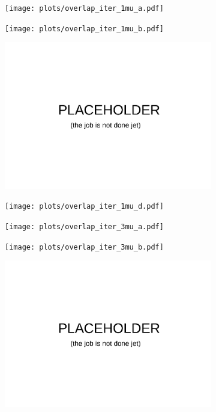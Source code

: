 \begin{figure}
    \centering
    \begin{subfigure}{0.5\textwidth}
    \texttt{[image: plots/overlap\_iter\_1mu\_a.pdf]}
    \end{subfigure}%
    \begin{subfigure}{0.5\textwidth}
    \texttt{[image: plots/overlap\_iter\_1mu\_b.pdf]}
    \end{subfigure}
    \begin{subfigure}{0.5\textwidth}
    \includegraphics[width=\linewidth]{plots/placeholder.pdf}
    \end{subfigure}%
    \begin{subfigure}{0.5\textwidth}
    \texttt{[image: plots/overlap\_iter\_1mu\_d.pdf]}
    \end{subfigure}
    \begin{subfigure}{0.5\textwidth}
    \texttt{[image: plots/overlap\_iter\_3mu\_a.pdf]}
    \end{subfigure}%
    \begin{subfigure}{0.5\textwidth}
    \texttt{[image: plots/overlap\_iter\_3mu\_b.pdf]}
    \end{subfigure}
    \begin{subfigure}{0.5\textwidth}
    \includegraphics[width=\linewidth]{plots/placeholder.pdf}

\end{subfigure}
\end{figure}

